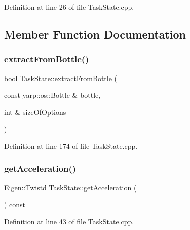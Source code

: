 Definition at line 26 of file Task\+State.\+cpp.



\subsection{Member Function Documentation}
\hypertarget{classocra_1_1TaskState_a64816fe1fdea6deaf1abfef335ab36c7}{}\label{classocra_1_1TaskState_a64816fe1fdea6deaf1abfef335ab36c7} 
\subsubsection{\texorpdfstring{extract\+From\+Bottle()}{extractFromBottle()}}
{\footnotesize\ttfamily bool Task\+State\+::extract\+From\+Bottle (\begin{DoxyParamCaption}\item[{const yarp\+::os\+::\+Bottle \&}]{bottle,  }\item[{int \&}]{size\+Of\+Options }\end{DoxyParamCaption})}



Definition at line 174 of file Task\+State.\+cpp.

\hypertarget{classocra_1_1TaskState_a807bf13b983e7656b89f559a16d61b26}{}\label{classocra_1_1TaskState_a807bf13b983e7656b89f559a16d61b26} 
\subsubsection{\texorpdfstring{get\+Acceleration()}{getAcceleration()}}
{\footnotesize\ttfamily Eigen\+::\+Twistd Task\+State\+::get\+Acceleration (\begin{DoxyParamCaption}{ }\end{DoxyParamCaption}) const}



Definition at line 43 of file Task\+State.\+cpp.

\hypertarget{classocra_1_1TaskState_ae7dd2f005a9aab81fa38e3dcad16af15}{}\label{classocra_1_1TaskState_ae7dd2f005a9aab81fa38e3dcad16af15} 
